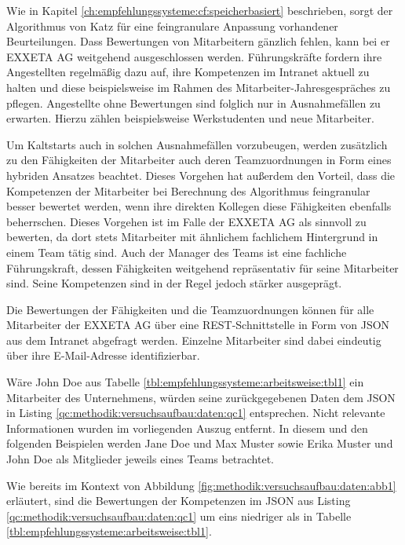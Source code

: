 Wie in Kapitel \ref{ch:empfehlungssysteme:cf:speicherbasiert} beschrieben, sorgt der Algorithmus von Katz für eine feingranulare Anpassung vorhandener Beurteilungen. Dass Bewertungen von Mitarbeitern gänzlich fehlen, kann bei er EXXETA AG weitgehend ausgeschlossen werden. Führungskräfte fordern ihre Angestellten regelmäßig dazu auf, ihre Kompetenzen im Intranet aktuell zu halten und diese beispielsweise im Rahmen des Mitarbeiter-Jahresgespräches zu pflegen. Angestellte ohne Bewertungen sind folglich nur in Ausnahmefällen zu erwarten. Hierzu zählen beispielsweise Werkstudenten und neue Mitarbeiter.

Um Kaltstarts auch in solchen Ausnahmefällen vorzubeugen, werden zusätzlich zu den Fähigkeiten der Mitarbeiter auch deren Teamzuordnungen in Form eines hybriden Ansatzes beachtet. Dieses Vorgehen hat außerdem den Vorteil, dass die Kompetenzen der Mitarbeiter bei Berechnung des Algorithmus feingranular besser bewertet werden, wenn ihre direkten Kollegen diese Fähigkeiten ebenfalls beherrschen. Dieses Vorgehen ist im Falle der EXXETA AG als sinnvoll zu bewerten, da dort stets Mitarbeiter mit ähnlichem fachlichem Hintergrund in einem Team tätig sind. Auch der Manager des Teams ist eine fachliche Führungskraft, dessen Fähigkeiten weitgehend repräsentativ für seine Mitarbeiter sind. Seine Kompetenzen sind in der Regel jedoch stärker ausgeprägt.

Die Bewertungen der Fähigkeiten und die Teamzuordnungen können für alle Mitarbeiter der EXXETA AG über eine REST-Schnittstelle in Form von JSON aus dem Intranet abgefragt werden. Einzelne Mitarbeiter sind dabei eindeutig über ihre E-Mail-Adresse identifizierbar.

Wäre John Doe aus Tabelle \ref{tbl:empfehlungssysteme:arbeitsweise:tbl1} ein Mitarbeiter des Unternehmens, würden seine zurückgegebenen Daten dem JSON in Listing \ref{qc:methodik:versuchsaufbau:daten:qc1} entsprechen. Nicht relevante Informationen wurden im vorliegenden Auszug entfernt. In diesem und den folgenden Beispielen werden Jane Doe und Max Muster sowie Erika Muster und John Doe als Mitglieder jeweils eines Teams betrachtet. 



Wie bereits im Kontext von Abbildung \ref{fig:methodik:versuchsaufbau:daten:abb1} erläutert, sind die Bewertungen der Kompetenzen im JSON aus Listing \ref{qc:methodik:versuchsaufbau:daten:qc1} um eins niedriger als in Tabelle \ref{tbl:empfehlungssysteme:arbeitsweise:tbl1}.

